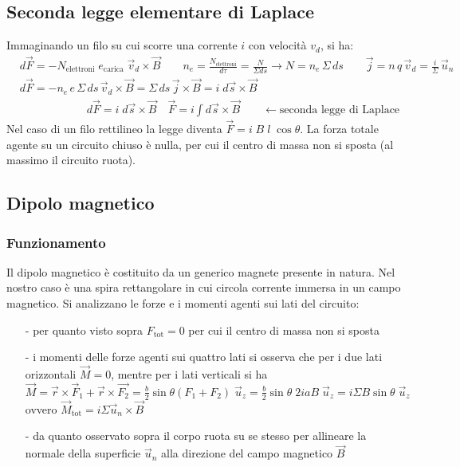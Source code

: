 \documentclass[a4paper]{article}
\newcommand\uz{\vec{u}_z}
\newcommand\un{\vec{u}_n}
\begin{document}
\subsection{Seconda legge elementare di Laplace}
Immaginando un filo su cui scorre una corrente \(i\) con velocità \(v_d\), si ha:
\begin{align*}
	& d\vec{F} = - N_\text{elettroni} \; e_\text{carica} \; \vec{v}_d \times \vec{B} \qquad n_e = \frac{N_\text{elettroni}}{d\tau} = \frac{N}{\Sigma ds} \rightarrow N = n_e \, \Sigma \, ds \qquad \vec{j} = n \, q \, \vec{v}_d = \frac{i}{\Sigma} \, \un \\
	& d\vec{F} = - n_e \, e \, \Sigma \, ds \, \vec{v}_d \times \vec{B} = \Sigma \, ds \, \vec{j} \times \vec{B} = i \; d\vec{s} \times \vec{B} \\
	&\qquad\qquad\qquad d\vec{F} = i \; d\vec{s} \times \vec{B} \quad \vec{F} = i \int d\vec{s} \times \vec{B} \qquad \leftarrow \text{seconda legge di Laplace}
\end{align*}
Nel caso di un filo rettilineo la legge diventa \(\vec{F} = i \; B \; l \; \cos \theta\). La forza totale agente su un circuito
chiuso è nulla, per cui il centro di massa non si sposta (al massimo il circuito ruota).

\subsection{Dipolo magnetico}
\subsubsection*{Funzionamento}
Il dipolo magnetico è costituito da un generico magnete presente in natura. Nel nostro caso è una spira rettangolare in cui circola
corrente immersa in un campo magnetico. Si analizzano le forze e i momenti agenti sui lati del circuito:
\begin{itemize}[topsep=3pt, itemsep=0pt]
	\item[-] per quanto visto sopra \(F_\text{tot} = 0\) per cui il centro di massa non si sposta
	\item[-] i momenti delle forze agenti sui quattro lati si osserva che per i due lati orizzontali \(\vec{M} = 0\), mentre per i
	lati verticali si ha \(\vec{M} = \vec{r} \times \vec{F}_1 + \vec{r} \times \vec{F_2} = \frac{b}{2} \sin \theta (F_1 + F_2) \; \uz = \frac{b}{2} \sin \theta \; 2 i a B \; \uz = i \Sigma B \sin \theta \; \uz\)
	ovvero \(\vec{M}_\text{tot} = i \Sigma \un \times \vec{B}\)
	\item[-] da quanto osservato sopra il corpo ruota su se stesso per allineare la normale della superficie \(\un\) alla direzione
	del campo magnetico \(\vec{B}\)
\end{itemize}
\end{document}
